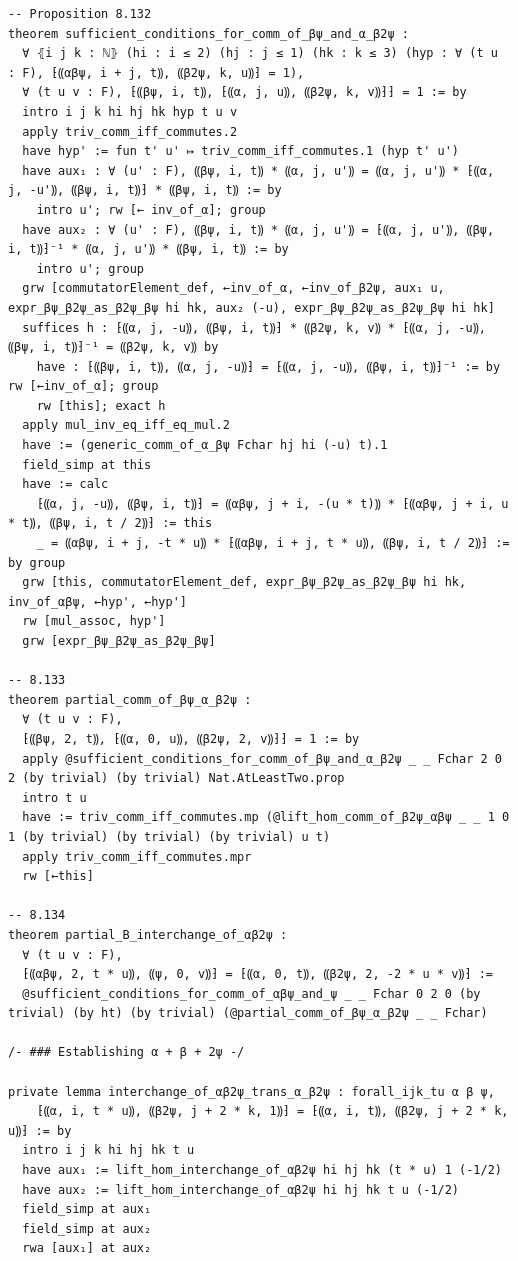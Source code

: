 \begin{Verbatim}
-- Proposition 8.132
theorem sufficient_conditions_for_comm_of_βψ_and_α_β2ψ :
  ∀ ⦃i j k : ℕ⦄ (hi : i ≤ 2) (hj : j ≤ 1) (hk : k ≤ 3) (hyp : ∀ (t u : F), ⁅⸨αβψ, i + j, t⸩, ⸨β2ψ, k, u⸩⁆ = 1),
  ∀ (t u v : F), ⁅⸨βψ, i, t⸩, ⁅⸨α, j, u⸩, ⸨β2ψ, k, v⸩⁆⁆ = 1 := by
  intro i j k hi hj hk hyp t u v
  apply triv_comm_iff_commutes.2
  have hyp' := fun t' u' ↦ triv_comm_iff_commutes.1 (hyp t' u')
  have aux₁ : ∀ (u' : F), ⸨βψ, i, t⸩ * ⸨α, j, u'⸩ = ⸨α, j, u'⸩ * ⁅⸨α, j, -u'⸩, ⸨βψ, i, t⸩⁆ * ⸨βψ, i, t⸩ := by
    intro u'; rw [← inv_of_α]; group
  have aux₂ : ∀ (u' : F), ⸨βψ, i, t⸩ * ⸨α, j, u'⸩ = ⁅⸨α, j, u'⸩, ⸨βψ, i, t⸩⁆⁻¹ * ⸨α, j, u'⸩ * ⸨βψ, i, t⸩ := by
    intro u'; group
  grw [commutatorElement_def, ←inv_of_α, ←inv_of_β2ψ, aux₁ u, expr_βψ_β2ψ_as_β2ψ_βψ hi hk, aux₂ (-u), expr_βψ_β2ψ_as_β2ψ_βψ hi hk]
  suffices h : ⁅⸨α, j, -u⸩, ⸨βψ, i, t⸩⁆ * ⸨β2ψ, k, v⸩ * ⁅⸨α, j, -u⸩, ⸨βψ, i, t⸩⁆⁻¹ = ⸨β2ψ, k, v⸩ by
    have : ⁅⸨βψ, i, t⸩, ⸨α, j, -u⸩⁆ = ⁅⸨α, j, -u⸩, ⸨βψ, i, t⸩⁆⁻¹ := by rw [←inv_of_α]; group
    rw [this]; exact h
  apply mul_inv_eq_iff_eq_mul.2
  have := (generic_comm_of_α_βψ Fchar hj hi (-u) t).1
  field_simp at this
  have := calc
    ⁅⸨α, j, -u⸩, ⸨βψ, i, t⸩⁆ = ⸨αβψ, j + i, -(u * t)⸩ * ⁅⸨αβψ, j + i, u * t⸩, ⸨βψ, i, t / 2⸩⁆ := this
    _ = ⸨αβψ, i + j, -t * u⸩ * ⁅⸨αβψ, i + j, t * u⸩, ⸨βψ, i, t / 2⸩⁆ := by group
  grw [this, commutatorElement_def, expr_βψ_β2ψ_as_β2ψ_βψ hi hk, inv_of_αβψ, ←hyp', ←hyp']
  rw [mul_assoc, hyp']
  grw [expr_βψ_β2ψ_as_β2ψ_βψ]

-- 8.133
theorem partial_comm_of_βψ_α_β2ψ :
  ∀ (t u v : F),
  ⁅⸨βψ, 2, t⸩, ⁅⸨α, 0, u⸩, ⸨β2ψ, 2, v⸩⁆⁆ = 1 := by
  apply @sufficient_conditions_for_comm_of_βψ_and_α_β2ψ _ _ Fchar 2 0 2 (by trivial) (by trivial) Nat.AtLeastTwo.prop
  intro t u
  have := triv_comm_iff_commutes.mp (@lift_hom_comm_of_β2ψ_αβψ _ _ 1 0 1 (by trivial) (by trivial) (by trivial) u t)
  apply triv_comm_iff_commutes.mpr
  rw [←this]

-- 8.134
theorem partial_B_interchange_of_αβ2ψ :
  ∀ (t u v : F),
  ⁅⸨αβψ, 2, t * u⸩, ⸨ψ, 0, v⸩⁆ = ⁅⸨α, 0, t⸩, ⸨β2ψ, 2, -2 * u * v⸩⁆ :=
  @sufficient_conditions_for_comm_of_αβψ_and_ψ _ _ Fchar 0 2 0 (by trivial) (by ht) (by trivial) (@partial_comm_of_βψ_α_β2ψ _ _ Fchar)

/- ### Establishing α + β + 2ψ -/

private lemma interchange_of_αβ2ψ_trans_α_β2ψ : forall_ijk_tu α β ψ,
    ⁅⸨α, i, t * u⸩, ⸨β2ψ, j + 2 * k, 1⸩⁆ = ⁅⸨α, i, t⸩, ⸨β2ψ, j + 2 * k, u⸩⁆ := by
  intro i j k hi hj hk t u
  have aux₁ := lift_hom_interchange_of_αβ2ψ hi hj hk (t * u) 1 (-1/2)
  have aux₂ := lift_hom_interchange_of_αβ2ψ hi hj hk t u (-1/2)
  field_simp at aux₁
  field_simp at aux₂
  rwa [aux₁] at aux₂


\end{Verbatim}
